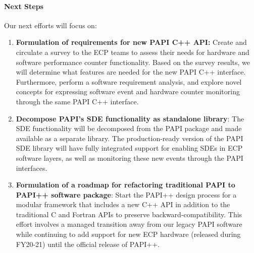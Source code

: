 \paragraph{Next Steps}

Our next efforts will focus on:
\begin{enumerate}
\item \textbf{Formulation of requirements for new PAPI C++ API:} 
		Create and circulate a survey to the ECP teams to assess their needs for hardware 
		and software performance counter functionality. Based on the survey results, 
		we will determine what features are needed for the new PAPI C++ interface. 
		Furthermore, perform a software requirement analysis, and explore novel concepts 
		for expressing software event and hardware counter 
		monitoring through the same PAPI C++ interface.
%
\item \textbf{Decompose PAPI's SDE functionality as standalone library}: 
		The SDE functionality will be decomposed from the PAPI package and made 
		available as a separate library. The production-ready version of the PAPI SDE 
		library will have fully integrated support for enabling SDEs in ECP software
		layers, as well as monitoring these new events through the PAPI interfaces.
%
\item \textbf{Formulation of a roadmap for refactoring traditional PAPI to PAPI++ software package}:
		Start the PAPI++ design process 
		for a modular framework that includes a new C++ API in addition to the traditional C 
		and Fortran APIs to preserve backward-compatibility. This effort involves a managed 
		transition away from our legacy PAPI software while continuing to add support for new 
		ECP hardware (released during FY20-21) until the official release of PAPI++.
\end{enumerate}
